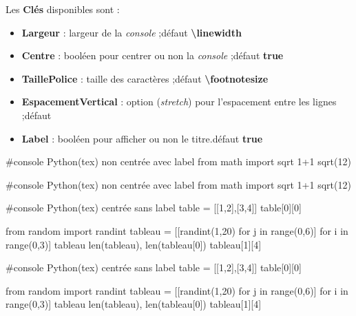 \documentclass[a4paper,french,11pt]{article}
\newcommand\Cle[1]{{\bfseries\sffamily\textlangle #1\textrangle}}
\begin{document}
\begin{codecles}
Les \Cle{Clés} disponibles sont :

\begin{itemize}
	\item \Cle{Largeur} : largeur de la \textit{console} ;\hfill{}défaut \Cle{\textbackslash linewidth}
	\item \Cle{Centre} : booléen pour centrer ou non la \textit{console} ;\hfill{}défaut \Cle{true}
	\item \Cle{TaillePolice} : taille des caractères ;\hfill{}défaut \Cle{\textbackslash footnotesize}
	\item \Cle{EspacementVertical} : option (\textit{stretch}) pour l'espacement entre les lignes ;\hfill{}défaut \Cle{1}
	\item \Cle{Label} : booléen pour afficher ou non le titre.\hfill{}défaut \Cle{true}
\end{itemize}
\end{codecles}

\begin{codetex}
\begin{ConsolePythontex}[Largeur=14cm,Centre=false]
	#console Python(tex) non centrée avec label
	from math import sqrt
	1+1
	sqrt(12)
\end{ConsolePythontex}
\end{codetex}

\begin{codesortie}
\smallskip
\begin{ConsolePythontex}[Largeur=14cm,Centre=false]
	#console Python(tex) non centrée avec label
	from math import sqrt
	1+1
	sqrt(12)
\end{ConsolePythontex}
\end{codesortie}

\begin{codetex}
\begin{ConsolePythontex}[Largeur=14cm,Label=false]
	#console Python(tex) centrée sans label
	table = [[1,2],[3,4]]
	table[0][0]
	
	from random import randint
	tableau = [[randint(1,20) for j in range(0,6)] for i in range(0,3)]
	tableau
	len(tableau), len(tableau[0])
	tableau[1][4]
\end{ConsolePythontex}
\end{codetex}

\begin{codesortie}
\smallskip
\begin{ConsolePythontex}[Largeur=14cm,Label=false]
	#console Python(tex) centrée sans label
	table = [[1,2],[3,4]]
	table[0][0]
	
	from random import randint
	tableau = [[randint(1,20) for j in range(0,6)] for i in range(0,3)]
	tableau
	len(tableau), len(tableau[0])
	tableau[1][4]
\end{ConsolePythontex}
\end{codesortie}
\end{document}
